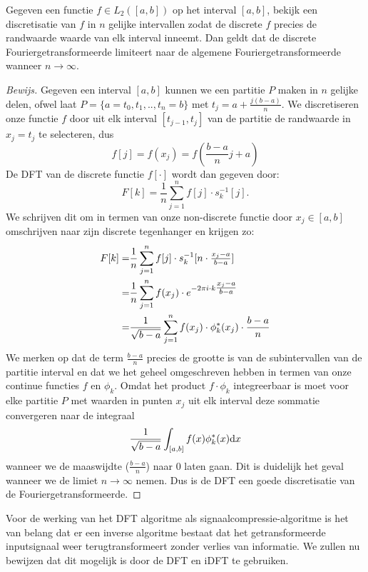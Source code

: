 \begin{stelling}
  Gegeven een functie $f\in L_2([a,b])$ op het interval $[a,b]$,
  bekijk een discretisatie van $f$ in $n$ gelijke intervallen zodat de discrete $f$ precies 
  de randwaarde waarde van elk interval inneemt.
  Dan geldt dat de discrete Fouriergetransformeerde limiteert naar de algemene Fouriergetransformeerde wanneer $n\to\infty$.
\end{stelling} 
\begin{proof}[Bewijs]
Gegeven een interval $[a,b]$ kunnen we een partitie $P$ maken in $n$ gelijke delen, 
ofwel laat $P=\{a=t_0,t_1,..,t_n=b\}$ met $t_j = a+\tfrac{j(b-a)}{n}$.
We discretiseren onze functie $f$ door uit elk interval $[t_{j-1},t_{j}]$ van de partitie de randwaarde in 
$x_j = t_j$ te selecteren, dus
\[
f[j] = f(x_j) = f(\frac{b-a}{n}j + a)
\]
De DFT van de discrete functie $f[\cdot]$ wordt dan gegeven door:
\[
F[k] = \frac1n\sum_{j=1}^n f[j] \cdot s_k^{-1}[j].
\]
We schrijven dit om in termen van onze non-discrete functie door $x_j\in[a,b]$ 
omschrijven naar zijn discrete tegenhanger en krijgen zo:
\begin{eqnarray*}
  F[k] =& \frac{1}{n} \sum_{j=1}^n f[j]\cdot s_k^{-1}[n\cdot\tfrac{x_j-a}{b-a}] \\
       =& \frac{1}{n} \sum_{j=1}^n f(x_j)\cdot e^{-{2\pi i} \cdot k \tfrac{x_j-a}{b-a}}\\
       =&  \frac{1}{\sqrt{b-a}}\sum_{j=1}^n f(x_j)\cdot \phi^*_k(x_j) \cdot\frac{b-a}{n} 
\end{eqnarray*}
We merken op dat de term $\frac{b-a}{n}$ precies de grootte is van de subintervallen van de partitie interval 
en dat we het geheel omgeschreven hebben in termen van onze continue functies $f$ en $\phi_k$.
Omdat het product $f\cdot\phi_k$ integreerbaar is moet voor elke partitie $P$ met 
waarden in punten $x_j$ uit elk interval deze sommatie convergeren naar de integraal
\[
  \frac{1}{\sqrt{b-a}} \int_{[a,b]} f(x) \phi^*_k(x) {\mathrm{d} x}
\]
wanneer we de maaswijdte ($\tfrac{b-a}{n}$) naar $0$ laten gaan. 
Dit is duidelijk het geval wanneer we de limiet $n\to\infty$ nemen. 
Dus is de DFT een goede discretisatie van de Fouriergetransformeerde. 
\end{proof}
 
Voor de werking van het DFT algoritme als signaalcompressie-algoritme is het van belang dat er een 
inverse algoritme bestaat dat het getransformeerde inputsignaal weer terugtransformeert 
zonder verlies van informatie. We zullen nu bewijzen dat dit mogelijk is door de DFT en iDFT te gebruiken.

